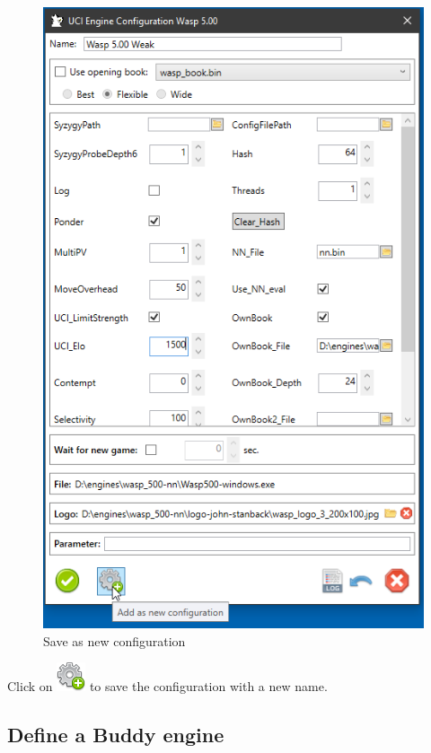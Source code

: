\documentclass[11pt,a4paper]{article}
\begin{document}
\begin{figure}[H]
	\centering
	\includegraphics[scale=0.8]{ConfigureWasp_2.png}
	\caption{Save as new configuration}
	\label{fig:LoadEngine3}
\end{figure}
Click on \includegraphics[scale=0.5]{cog_add.png} to save the configuration with a new name.\\


\subsection{Define a Buddy engine} \label{BuddyEngine}
\end{document}
